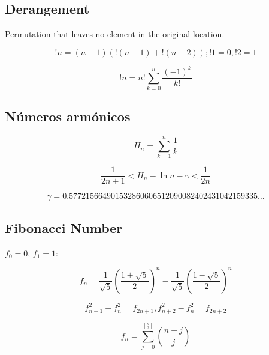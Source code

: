 \documentclass[a4paper]{amsart}
\begin{document}
      \subsection{Derangement} Permutation that leaves no element in the original location.

      \begin{equation*}
        !n = (n - 1)( !(n - 1) + !(n - 2) ); !1 = 0, !2 = 1
      \end{equation*}

      \begin{equation*}
        !n = n! \sum_{k = 0}^n \frac{(-1)^k}{k!}
      \end{equation*}

    \subsection{Números armónicos}

    \begin{equation*}
     H_n = \sum_{k = 1}^n \frac{1}{k}
    \end{equation*}

    \begin{equation*}
     \frac{1}{2n+1} < H_n - \ln n - \gamma < \frac{1}{2n}
    \end{equation*}

    \begin{equation*}
     \gamma = 0.57721 56649 01532 86060 65120 90082 40243 10421 59335 \ldots
    \end{equation*}

    \subsection{Fibonacci Number} $f_0 = 0$, $f_1 = 1$:

    \begin{equation*}
     f_n = \frac{1}{\sqrt{5}}(\frac{1 + \sqrt{5}}{2})^n - \frac{1}{\sqrt{5}}(\frac{1 - \sqrt{5}}{2})^n
    \end{equation*}

    \begin{equation*}
     f_{n+1}^2 + f_n^2 = f_{2n + 1}, 
     f_{n+2}^2 - f_n^2 = f_{2n + 2}
    \end{equation*}

    \begin{equation*}
     f_n = \sum_{j = 0}^{\lfloor \frac{n}{2} \rfloor} \binom{n-j}{j}
    \end{equation*}
\end{document}
